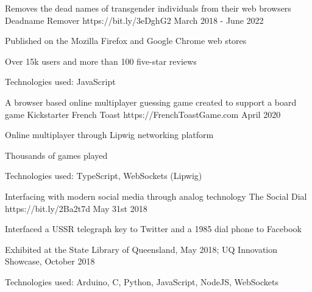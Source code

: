 


\begin{cventries}

\cventry
{Removes the dead names of transgender individuals from their web browsers} %
{Deadname Remover} %
{https://bit.ly/3eDghG2} %
{March 2018 - June 2022} %
{ %
\begin{cvitems}
\item Published on the Mozilla Firefox and Google Chrome web stores
\item Over 15k users and more than 100 five-star reviews
\item Technologies used: JavaScript
\end{cvitems}
}

\cventry
{A browser based online multiplayer guessing game created to support a board game Kickstarter} %
{French Toast} %
{https://FrenchToastGame.com} %
{April 2020} %
{ %
\begin{cvitems}
\item Online multiplayer through Lipwig networking platform
\item Thousands of games played
\item Technologies used: TypeScript, WebSockets (Lipwig)
\end{cvitems}
}

\cventry
{Interfacing with modern social media through analog technology} %
{The Social Dial} %
{https://bit.ly/2Ba2t7d} %
{May 31st 2018} %
{ %
\begin{cvitems}
\item Interfaced a USSR telegraph key to Twitter and a 1985 dial phone to Facebook
\item Exhibited at the State Library of Queensland, May 2018; UQ Innovation Showcase, October 2018
\item Technologies used: Arduino, C, Python, JavaScript, NodeJS, WebSockets
\end{cvitems}
}


\end{cventries}
